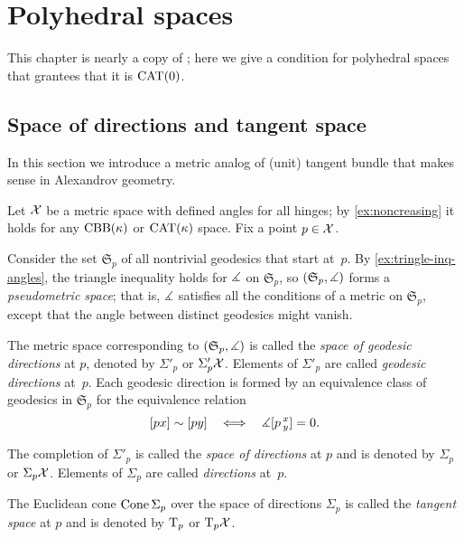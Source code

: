 \chapter{Polyhedral spaces}\label{chapter:polyhedral}

This chapter is nearly a copy of \cite[Sections 1.7, 3.4, and 3.5]{alexander-kapovitch-petrunin-2019};
here we give a condition for polyhedral spaces that grantees that it is $\mathrm{CAT}(0)$.


\section{Space of directions and tangent space}
\label{sec:tangent-space+directions}

In this section we introduce a metric analog of (unit) tangent bundle that makes sense in Alexandrov geometry.

Let $\mathcal{X}$ be a metric space with defined angles for all hinges;
by \ref{ex:noncreasing} it holds for any $\mathrm{CBB}(\kappa)$ or $\mathrm{CAT}(\kappa)$ space.
Fix a point $p\in \mathcal{X}$. 

Consider the set $\mathfrak{S}_p$ 
of all nontrivial geodesics  that start at~$p$.
By \ref{ex:tringle-inq-angles}, the triangle inequality holds for $\measuredangle$ on $\mathfrak{S}_p$,
so
 $(\mathfrak{S}_p,\measuredangle)$ 
forms a \emph{pseudometric space};
that is, $\measuredangle$ satisfies all the conditions of a metric on $\mathfrak{S}_p$, except that  the angle between distinct geodesics might vanish.

The metric space corresponding to  $(\mathfrak{S}_p,\measuredangle)$ is called the \emph{space of geodesic directions} at $p$, denoted by $\Sigma'_p$ or $\Sigma'_p\mathcal{X}$.
Elements of $\Sigma'_p$ are called \emph{geodesic directions} at~$p$.
Each geodesic direction is formed by an equivalence class of geodesics in $\mathfrak{S}_p$
for the equivalence relation 
\[[px]\sim[py]\ \ \iff\ \ \mangle\hinge pxy=0.\]

The completion of $\Sigma'_p$ is called the 
\emph{space of directions} at $p$ and is denoted by $\Sigma_p$ or $\Sigma_p\mathcal{X}$.
Elements of $\Sigma_p$ are called \emph{directions} at~$p$.

The Euclidean cone $\mathop{\rm Cone}\nolimits\Sigma_p$ over the space of directions $\Sigma_p$ is called the \emph{tangent space} at  $p$ and is denoted by $\mathrm{T}_p$ or $\mathrm{T}_p\mathcal{X}$.

